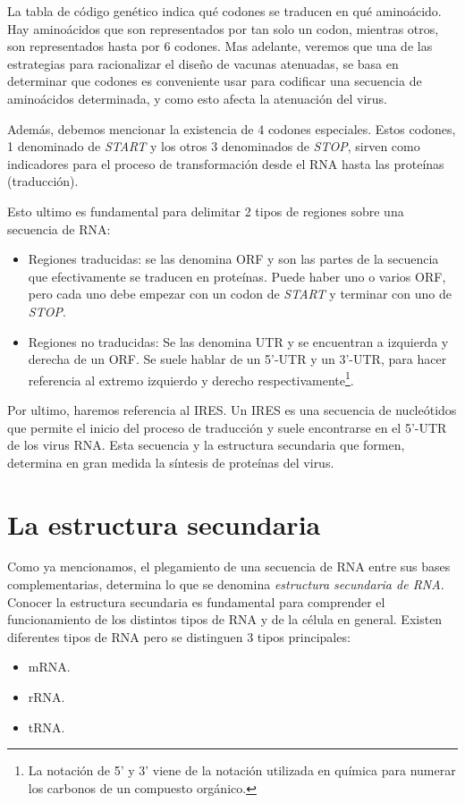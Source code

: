 La tabla de c\'odigo gen\'etico indica qu\'e codones se traducen en qu\'e
amino\'acido. Hay amino\'acidos que son representados por tan solo un codon,
mientras otros, son representados hasta por 6 codones. Mas adelante, veremos que
una de las estrategias para racionalizar el dise\~no de vacunas atenuadas, se
basa en determinar que codones es conveniente usar para codificar una secuencia
de amino\'acidos determinada, y como esto afecta la atenuaci\'on del virus.

Adem\'as, debemos mencionar la existencia de 4 codones especiales. Estos
codones, 1 denominado de \textit{START} y los otros 3 denominados de
\textit{STOP}, sirven como indicadores para el proceso de transformaci\'on desde
el \ac{RNA} hasta las prote\'inas (traducci\'on).

Esto ultimo es fundamental para delimitar 2 tipos de regiones sobre una
secuencia de \ac{RNA}:
\begin{itemize}
 \item Regiones traducidas: se las denomina \ac{ORF} y son las partes de la
secuencia que efectivamente se traducen en prote\'inas. Puede haber uno o varios
\ac{ORF}, pero cada uno debe empezar con un codon de \textit{START} y terminar
con uno de \textit{STOP}.
 \item Regiones no traducidas: Se las denomina \ac{UTR} y se encuentran a
izquierda y derecha de un \ac{ORF}. Se suele hablar de un 5'-\ac{UTR} y un
3'-\ac{UTR}, para hacer referencia al extremo izquierdo y derecho
respectivamente\footnote{La notaci\'on de 5' y 3' viene de la notaci\'on
utilizada en qu\'imica para numerar los carbonos de un compuesto org\'anico.}.
\end{itemize}

Por ultimo, haremos referencia al \ac{IRES}. Un \ac{IRES} es una secuencia de
nucle\'otidos que permite el inicio del proceso de traducci\'on y suele
encontrarse en el 5'-\ac{UTR} de los virus \ac{RNA}. Esta secuencia y la
estructura secundaria que formen, determina en gran medida la s\'intesis de
prote\'inas del virus.

\section{La estructura secundaria}
\label{estructura}
Como ya mencionamos, el plegamiento de una secuencia de \ac{RNA} entre sus bases
complementarias, determina lo que se denomina \textit{estructura secundaria de
\ac{RNA}}. Conocer la estructura secundaria es fundamental para comprender el
funcionamiento de los distintos tipos de \ac{RNA} y de la c\'elula en general.
Existen diferentes tipos de \ac{RNA} pero se distinguen 3 tipos principales: 
\begin{itemize}
 \item \ac{mRNA}.
 \item \ac{rRNA}.
 \item \ac{tRNA}. 
\end{itemize}

